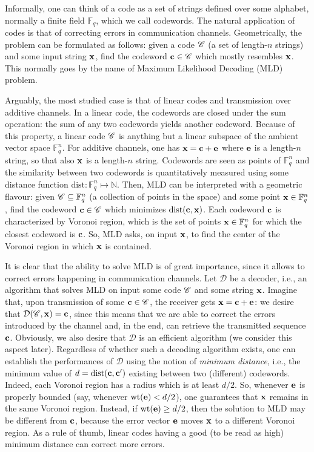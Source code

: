 Informally, one can think of a code as a set of strings defined over some alphabet, normally a finite field $\mathbb F_q$, which we call codewords. 
The natural application of codes is that of correcting errors in communication channels.
Geometrically, the problem can be formulated as follows: given a code $\mathscr C$ (a set of length-$n$ strings) and some input string $\mathbf x$, find the codeword $\mathbf c\in\mathscr C$ which mostly resembles $\mathbf x$.
This normally goes by the name of Maximum Likelihood Decoding (MLD) problem.

Arguably, the most studied case is that of linear codes and transmission over additive channels.
In a linear code, the codewords are closed under the sum operation: the sum of any two codewords yields another codeword. 
Because of this property, a linear code $\mathscr C$ is anything but a linear subspace of the ambient vector space $\mathbb F_q^n$.
For additive channels, one has $\mathbf x = \mathbf c+\mathbf e$ where $\mathbf e$ is a length-$n$ string, so that also $\mathbf x$ is a length-$n$ string.
Codewords are seen as points of $\mathbb F_q^n$ and the similarity between two codewords is quantitatively measured using some distance function $\mathrm{dist}:\mathbb F_q^n\mapsto \mathbb N$.
Then, MLD can be interpreted with a geometric flavour: given $\mathscr C\subseteq \mathbb F_q^n$ (a collection of points in the space) and some point $\mathbf x\in\mathbb F_q^n$, find the codeword $\mathbf c\in\mathscr C$ which minimizes $\mathrm{dist}(\mathbf c, \mathbf x)$.
Each codeword $\mathbf c$ is characterized by Voronoi region, which is the set of points $\mathbf x\in\mathbb F_q^n$ for which the closest codeword is $\mathbf c$.
So, MLD asks, on input $\mathbf x$, to find the center of the Voronoi region in which $\mathbf x$ is contained.

It is clear that the ability to solve MLD is of great importance, since it allows to correct errors happening in communication channels.
Let $\mathcal D$ be a decoder, i.e., an algorithm that solves MLD on input some code $\mathscr C$ and some string $\mathbf x$.
Imagine that, upon transmission of some $\mathbf c\in\mathscr C$, the receiver gets $\mathbf x = \mathbf c+\mathbf e$: we desire that $\mathcal D(\mathscr C, \mathbf x) = \mathbf c$, since this means that we are able to correct the errors introduced by the channel and, in the end, can retrieve the transmitted sequence $\mathbf c$.
Obviously, we also desire that $\mathcal D$ is an efficient algorithm (we consider this aspect later).
Regardless of whether such a decoding algorithm exists, one can establish the performances of $\mathcal D$ using the notion of \textit{minimum distance}, i.e., the minimum value of $d =\mathrm{dist}(\mathbf c, \mathbf c')$ existing between two (different) codewords.
Indeed, each Voronoi region has a radius which is at least $d/2$.
So, whenever $\mathbf e$ is properly bounded (say, whenever $\mathrm{wt}(\mathbf e)<d/2$), one guarantees that $\mathbf x$ remains in the same Voronoi region.
Instead, if $\mathrm{wt}(\mathbf e)\geq d/2$, then the solution to MLD may be different from $\mathbf c$, because the error vector $\mathbf e$ moves $\mathbf x$ to a different Voronoi region.
As a rule of thumb, linear codes having a good (to be read as high) minimum distance can correct more errors.

